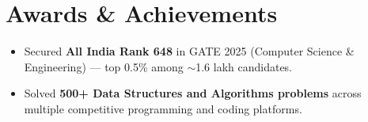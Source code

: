 \documentclass[letterpaper,11pt]{article}
\newcommand{\resumeItem}[1]{
  \item\small{#1\vspace{-3pt}}
}
\newcommand{\resumeItemListStart}{\begin{itemize}[leftmargin=0.15in]}
\newcommand{\resumeItemListEnd}{\end{itemize}\vspace{-4pt}}
\begin{document}
\section{Awards \& Achievements}
\resumeItemListStart
  \resumeItem{Secured \textbf{All India Rank 648} in GATE 2025 (Computer Science \& Engineering) --- top 0.5\% among $\sim$1.6 lakh candidates.}
  \resumeItem{Solved \textbf{500+ Data Structures and Algorithms problems} across multiple competitive programming and coding platforms.}
\resumeItemListEnd
\end{document}
